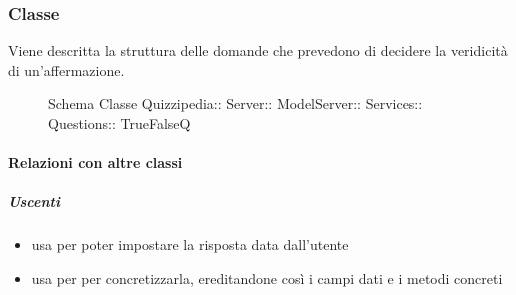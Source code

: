 \subsubsection{Classe }
Viene descritta la struttura delle domande che prevedono di decidere la veridicità di un'affermazione.
\begin{figure}[H]
\centering
\noindent{}
\caption[Schema Classe TrueFalseQ]{Schema Classe Quizzipedia:: Server:: ModelServer:: Services:: Questions:: TrueFalseQ}
\end{figure}
\paragraph{Relazioni con altre classi}
\subparagraph{Uscenti}
\begin{itemize}
\item usa  per poter impostare la risposta data dall'utente
\item usa  per per concretizzarla, ereditandone così i campi dati e i metodi concreti
\end{itemize}
